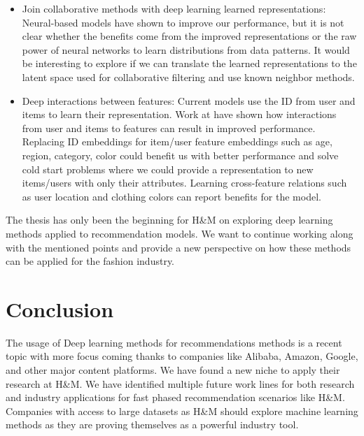 \documentclass{kththesis}
\begin{document}
\begin{itemize}
    \item Join collaborative methods with deep learning learned representations: Neural-based models have shown to improve our performance, but it is not clear whether the benefits come from the improved representations or the raw power of neural networks to learn distributions from data patterns. It would be interesting to explore if we can translate the learned representations to the latent space used for collaborative filtering and use known neighbor methods.
    
    \item Deep interactions between features: Current models use the ID from user and items to learn their representation. Work at \cite{xDeepFM}\cite{alibaba} have shown how interactions from user and items to features can result in improved performance. Replacing ID embeddings for item/user feature embeddings such as age, region, category, color could benefit us with better performance and solve cold start problems where we could provide a representation to new items/users with only their attributes. Learning cross-feature relations such as user location and clothing colors can report benefits for the model.
\end{itemize}

The thesis has only been the beginning for H\&M on exploring deep learning methods applied to recommendation models. We want to continue working along with the mentioned points and provide a new perspective on how these methods can be applied for the fashion industry. 

\section{Conclusion}

The usage of Deep learning methods for recommendations methods is a recent topic with more focus coming thanks to companies like Alibaba, Amazon, Google, and other major content platforms. We have found a new niche to apply their research at H\&M. We have identified multiple future work lines for both research and industry applications for fast phased recommendation scenarios like H\&M. Companies with access to large datasets as H\&M should explore machine learning methods as they are proving themselves as a powerful industry tool.

\printbibliography
\end{document}
